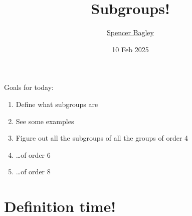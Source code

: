 \documentclass[8pt, handout]{beamer}
\newcommand{\Pause}{\pause}      %
\begin{document}

\title[Subgroups!]{Subgroups!}

\author[\href{mailto:sbagley@westminsteru.edu}{S. Bagley}]
       {\href{mailto:sbagley@westminsteru.edu}{Spencer Bagley}}


\date[10 Feb 2025]{10 Feb 2025}

\frame{\titlepage}


\begin{frame}{Goals for today:}
  \begin{enumerate}
    \item Define what subgroups are \Pause
    \item See some examples \Pause
    \item Figure out all the subgroups of all the groups of order 4 \Pause
    \item \ldots of order 6 \Pause
    \item \ldots of order 8
  \end{enumerate}
\end{frame}


\section{Definition time!}
\end{document}
